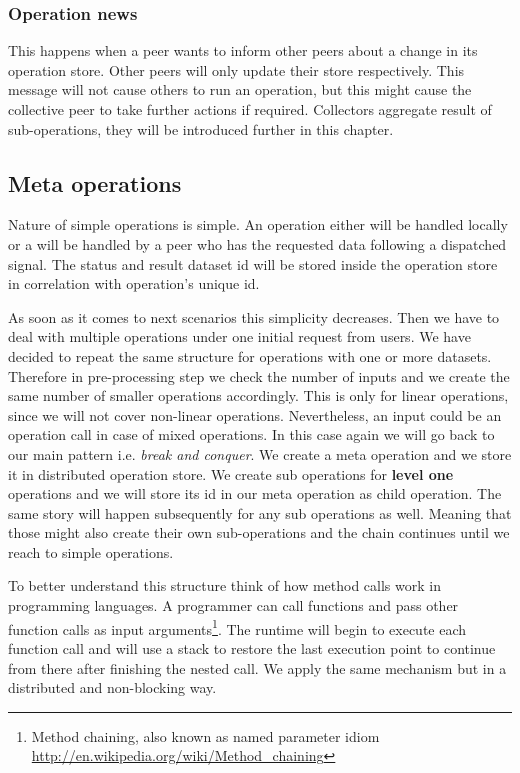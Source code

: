\subsubsection{Operation news}
This happens when a peer wants to inform other peers about a change in its operation store.
Other peers will only update their store respectively.
This message will not cause others to run an operation, 
but this might cause the collective peer to take further actions if required. 
Collectors aggregate result of sub-operations, they will be introduced further in this chapter.

\subsection{Meta operations}
Nature of simple operations is simple. 
An operation either will be handled locally or a will be handled
by a peer who has the requested data following a dispatched signal. 
The status and result dataset id will be stored inside the operation store in correlation with operation's unique id.

As soon as it comes to next scenarios this simplicity decreases. 
Then we have to deal with multiple operations under one initial request from users.
We have decided to repeat the same structure for operations with one or more datasets.
Therefore in pre-processing step we check the number of inputs and we create the same number of
smaller operations accordingly. 
This is only for linear operations, since we will not cover non-linear operations.
Nevertheless, an input could be an operation call in case of mixed operations.
In this case again we will go back to our main pattern i.e. \textit{break and conquer}. 
We create a meta operation and we store it in distributed operation store. 
We create sub operations for \textbf{level one} operations and we will store its id 
in our meta operation as child operation. 
The same story will happen subsequently for any sub operations as well. 
Meaning that those might also create their own sub-operations and the chain continues until we reach to simple operations.

To better understand this structure think of how method calls work in programming languages.
A programmer can call functions and pass other function calls as input 
arguments\footnote{Method chaining, also known as named parameter idiom \url{http://en.wikipedia.org/wiki/Method_chaining}}.
The runtime will begin to execute each function call and will use a stack to restore
the last execution point to continue from there after finishing the nested call.
We apply the same mechanism but in a distributed and non-blocking way.

